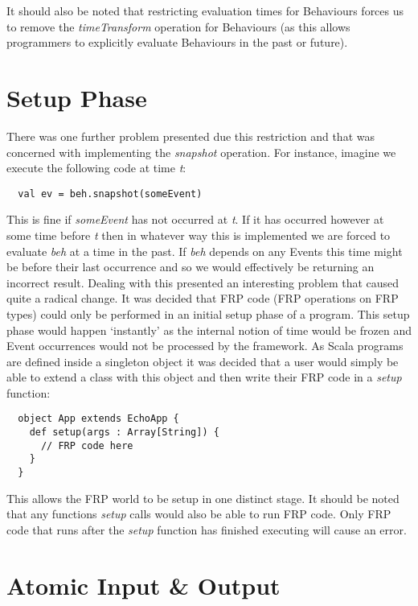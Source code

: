     It should also be noted that restricting evaluation times for Behaviours forces us
    to remove the \emph{timeTransform} operation for Behaviours (as this allows programmers to explicitly
    evaluate Behaviours in the past or future).
  
    \section{Setup Phase}
      There was one further problem presented due this restriction and that was concerned with
      implementing the \emph{snapshot} operation. For instance, imagine we execute the following code
      at time \emph{t}:

  \begin{verbatim}
  val ev = beh.snapshot(someEvent)
  \end{verbatim}

      This is fine if \emph{someEvent} has not occurred at \emph{t}. If it has occurred however at some time
      before \emph{t} then in whatever way this is implemented we are forced to evaluate \emph{beh}
      at a time in the past. If \emph{beh} depends on any Events this time might be before their
      last occurrence and so we would effectively be returning an incorrect result. Dealing with this
      presented an interesting problem that caused quite a radical change. It was decided that FRP
      code (FRP operations on FRP types) could only be performed in an initial setup phase of a program.
      This setup phase would happen `instantly' as the internal notion of time would be frozen and Event
      occurrences would not be processed by the framework. As Scala programs are defined inside a singleton
      object it was decided that a user would simply be able to extend a class with this object and then
      write their FRP code in a \emph{setup} function:

  \begin{verbatim}
  object App extends EchoApp {
    def setup(args : Array[String]) {
      // FRP code here
    }
  }
  \end{verbatim}
  
    This allows the FRP world to be setup in one distinct stage. It should be noted that
    any functions \emph{setup} calls would also be able to run FRP code. Only FRP code that runs
    after the \emph{setup} function has finished executing will cause an error.
  
  \section{Atomic Input & Output}
    
